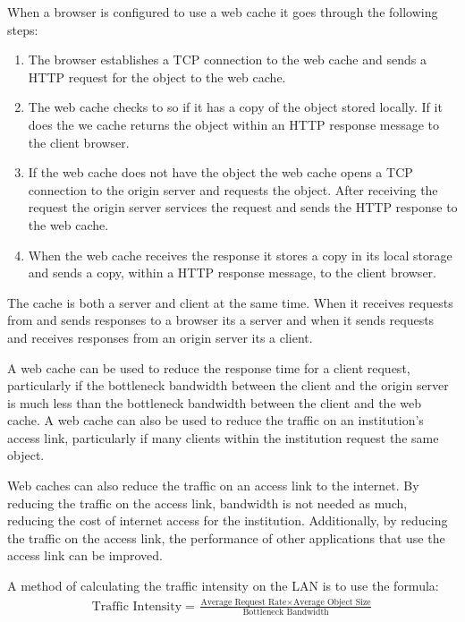 \documentclass[12pt letter]{report}
\begin{document}

When a browser is configured to use a web cache it goes through the
following steps:
\begin{enumerate}
  \item The browser establishes a TCP connection to the web cache and
    sends a HTTP request for the object to the web cache.
  \item The web cache checks to so if it has a copy of the object
    stored locally. If it does the we cache returns the object within
    an HTTP response message to the client browser.
  \item If the web cache does not have the object the web cache opens
    a TCP connection to the origin server and requests the object.
    After receiving the request the origin server services the
    request and sends the HTTP response to the web cache.
  \item When the web cache receives the response it stores a copy in
    its local storage and sends a copy, within a HTTP response
    message, to the client browser.
\end{enumerate}

The cache is both a server and client at the same time. When it
receives requests from and sends responses to a browser its a server
and when it sends requests and receives responses from an origin
server its a client.

A web cache can be used to reduce the response time for a client
request, particularly if the bottleneck bandwidth between the client
and the origin server is much less than the bottleneck bandwidth
between the client and the web cache. A web cache can also be used to
reduce the traffic on an institution's access link, particularly if
many clients within the institution request the same object.

Web caches can also reduce the traffic on an access link to the
internet. By reducing the traffic on the access link, bandwidth is
not needed as much, reducing the cost of internet access for the
institution. Additionally, by reducing the traffic on the access
link, the performance of other applications that use the access link
can be improved.

A method of calculating the traffic intensity on the LAN is to use the formula:
\begin{align*}
  \text{Traffic Intensity} = \frac{\text{Average Request Rate} \times
  \text{Average Object Size}}{\text{Bottleneck Bandwidth}}
\end{align*}
\end{document}
